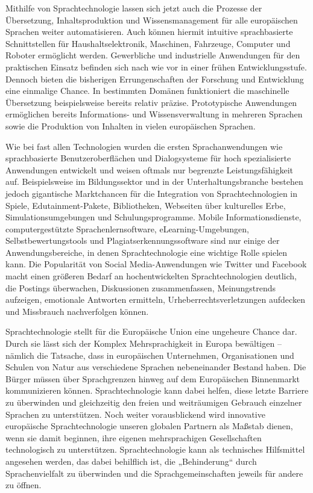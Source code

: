 \documentclass[]{../../metanetpaper}
\begin{document}
\begin{Parallel}[c]{80mm}{80mm}
{Mithilfe von Sprachtechnologie lassen sich jetzt auch die Prozesse der Übersetzung, Inhaltsproduktion und Wissensmanagement für alle europäischen Sprachen weiter automatisieren. Auch können hiermit intuitive sprachbasierte Schnittstellen für Haushaltselektronik, Maschinen, Fahrzeuge, Computer und Roboter ermöglicht werden. Gewerbliche und industrielle Anwendungen für den praktischen Einsatz befinden sich nach wie vor in einer frühen Entwicklungsstufe. Dennoch bieten die bisherigen Errungenschaften der Forschung und Entwicklung eine einmalige Chance. In bestimmten Domänen funktioniert die maschinelle Übersetzung beispielsweise bereits relativ präzise. Prototypische Anwendungen ermöglichen bereits Informations- und Wissensverwaltung in mehreren Sprachen sowie die Produktion von Inhalten in vielen europäischen Sprachen. 

Wie bei fast allen Technologien wurden die ersten Sprachanwendungen wie sprachbasierte Benutzeroberflächen und Dialogsysteme für hoch spezialisierte Anwendungen entwickelt und weisen oftmals nur begrenzte Leistungsfähigkeit auf. Beispielsweise im Bildungssektor und in der Unterhaltungsbranche bestehen jedoch gigantische Marktchancen für die Integration von Sprachtechnologien in Spiele, Edutainment-Pakete, Bibliotheken, Webseiten über kulturelles Erbe, Simulationsumgebungen und Schulungsprogramme. Mobile Informationsdienste, computergestützte Sprachenlernsoftware, eLearning-Umgebungen, Selbstbewertungstools und Plagiatserkennungssoftware sind nur einige der Anwendungsbereiche, in denen Sprachtechnologie eine wichtige Rolle spielen kann. Die Popularität von Social Media-Anwendungen wie Twitter und Facebook macht einen größeren Bedarf an hochentwickelten Sprachtechnologien deutlich, die Postings überwachen, Diskussionen zusammenfassen, Meinungstrends aufzeigen, emotionale Antworten ermitteln, Urheberrechtsverletzungen aufdecken und Missbrauch nachverfolgen können.

Sprachtechnologie stellt für die Europäische Union eine ungeheure Chance dar. Durch sie lässt sich der Komplex Mehrsprachigkeit in Europa bewältigen – nämlich die Tatsache, dass in europäischen Unternehmen, Organisationen und Schulen von Natur aus verschiedene Sprachen nebeneinander Bestand haben. Die Bürger müssen über Sprachgrenzen hinweg auf dem Europäischen Binnenmarkt kommunizieren können. Sprachtechnologie kann dabei helfen, diese letzte Barriere zu überwinden und gleichzeitig den freien und weiträumigen Gebrauch einzelner Sprachen zu unterstützen. Noch weiter vorausblickend wird innovative europäische Sprachtechnologie unseren globalen Partnern als Maßstab dienen, wenn sie damit beginnen, ihre eigenen mehrsprachigen Gesellschaften technologisch zu unterstützen. Sprachtechnologie kann als technisches Hilfsmittel angesehen werden, das dabei behilflich ist, die „Behinderung“ durch Sprachenvielfalt zu überwinden und die Sprachgemeinschaften jeweils für andere zu öffnen.

}
\end{Parallel}
\end{document}
